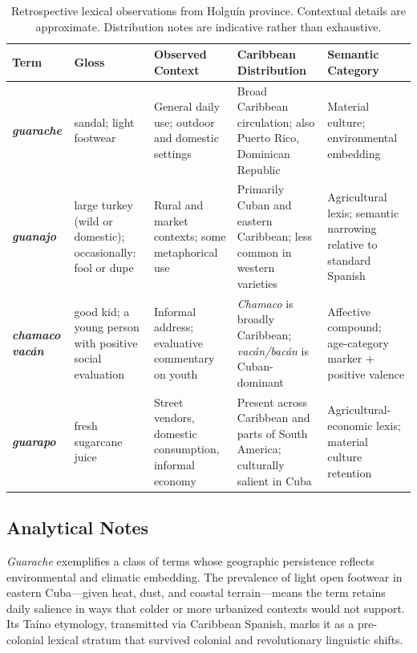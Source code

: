 \documentclass[12pt]{article}
\begin{document}
\begin{table}[h!]
\centering
\small
\begin{tabular}{@{}>{\bfseries}p{2.8cm} p{2.4cm} p{3.6cm} p{2.4cm} p{3.0cm}@{}}
\toprule
Term & Gloss & Observed Context & Caribbean Distribution & Semantic Category \\
\midrule
\textit{guarache} &
  sandal; light footwear &
  General daily use; outdoor and domestic settings &
  Broad Caribbean circulation; also Puerto Rico, Dominican Republic &
  Material culture; environmental embedding \\[6pt]
\textit{guanajo} &
  large turkey (wild or domestic); occasionally: fool or dupe &
  Rural and market contexts; some metaphorical use &
  Primarily Cuban and eastern Caribbean; less common in western varieties &
  Agricultural lexis; semantic narrowing relative to standard Spanish \\[6pt]
\textit{chamaco vacán} &
  good kid; a young person with positive social evaluation &
  Informal address; evaluative commentary on youth &
  \textit{Chamaco} is broadly Caribbean; \textit{vacán/bacán} is Cuban-dominant &
  Affective compound; age-category marker + positive valence \\[6pt]
\textit{guarapo} &
  fresh sugarcane juice &
  Street vendors, domestic consumption, informal economy &
  Present across Caribbean and parts of South America; culturally salient in Cuba &
  Agricultural-economic lexis; material culture retention \\
\bottomrule
\end{tabular}
\caption{Retrospective lexical observations from Holguín province. Contextual details are approximate. Distribution notes are indicative rather than exhaustive.}
\label{tab:holguin}
\end{table}

\subsection*{Analytical Notes}

\textit{Guarache} exemplifies a class of terms whose geographic persistence reflects environmental and climatic embedding. The prevalence of light open footwear in eastern Cuba---given heat, dust, and coastal terrain---means the term retains daily salience in ways that colder or more urbanized contexts would not support. Its Taíno etymology, transmitted via Caribbean Spanish, marks it as a pre-colonial lexical stratum that survived colonial and revolutionary linguistic shifts.
\end{document}
